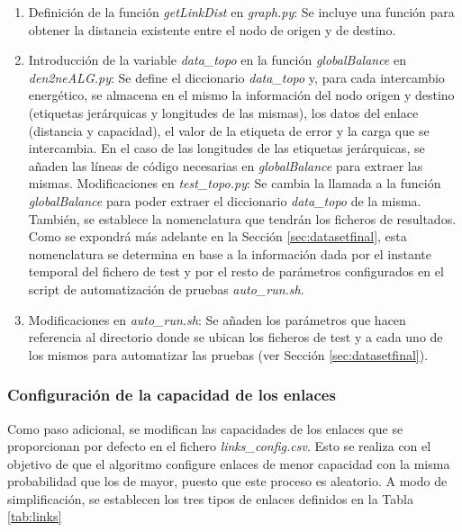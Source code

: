 \begin{enumerate}
    \item Definición de la función \textit{getLinkDist} en \textit{graph.py}: Se incluye una función para obtener la distancia existente entre el nodo de origen y de destino.    
    \item Introducción de la variable \textit{data\_topo} en la función \textit{globalBalance} en \textit{den2neALG.py}: Se define el diccionario \textit{data\_topo} y, para cada intercambio energético, se almacena en el mismo la información del nodo origen y destino (etiquetas jerárquicas y longitudes de las mismas), los datos del enlace (distancia y capacidad), el valor de la etiqueta de error y la carga que se intercambia. En el caso de las longitudes de las etiquetas jerárquicas, se añaden las líneas de código necesarias en \textit{globalBalance} para extraer las mismas.
    Modificaciones en \textit{test\_topo.py}: Se cambia la llamada a la función \textit{globalBalance} para poder extraer el diccionario \textit{data\_topo} de la misma. También, se establece la nomenclatura que tendrán los ficheros de resultados. Como se expondrá más adelante en la Sección \ref{sec:datasetfinal}, esta nomenclatura se determina en base a la información dada por el instante temporal del fichero de test y por el resto de parámetros configurados en el script de automatización de pruebas \textit{auto\_run.sh}.
    \item Modificaciones en \textit{auto\_run.sh}: Se añaden los parámetros que hacen referencia al directorio donde se ubican los ficheros de test y a cada uno de los mismos para automatizar las pruebas (ver Sección \ref{sec:datasetfinal}).
\end{enumerate} 

\subsubsection{Configuración de la capacidad de los enlaces}
Como paso adicional, se modifican las capacidades de los enlaces que se proporcionan por defecto en el fichero \textit{links\_config.csv}. Esto se realiza con el objetivo de que el algoritmo configure enlaces de menor capacidad con la misma probabilidad que los de mayor, puesto que este proceso es aleatorio. A modo de simplificación, se establecen los tres tipos de enlaces definidos en la Tabla \ref{tab:links}

\vspace{3mm}

